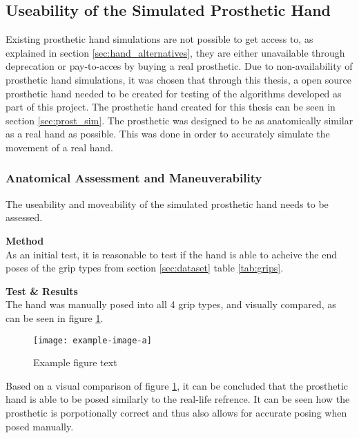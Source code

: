 \documentclass[../main.tex]{subfiles}
\begin{document}
\subsection{Useability of the Simulated Prosthetic Hand}

Existing prosthetic hand simulations are not possible to get access to, as explained in section \ref{sec:hand_alternatives}, they are either unavailable through deprecation or pay-to-acces by buying a real prosthetic.
Due to non-availability of prosthetic hand simulations, it was chosen that through this thesis, a open source prosthetic hand needed to be created for testing of the algorithms developed as part of this project.
The prosthetic hand created for this thesis can be seen in section \ref{sec:prost_sim}.
The prosthetic was designed to be as anatomically similar as a real hand as possible.
This was done in order to accurately simulate the movement of a real hand.

\subsubsection{Anatomical Assessment and Maneuverability}

The useability and moveability of the simulated prosthetic hand needs to be assessed.

\textbf{Method}\\
As an initial test, it is reasonable to test if the hand is able to acheive the end poses of the grip types from section \ref{sec:dataset} table \ref{tab:grips}. 

\textbf{Test \& Results}\\

The hand was manually posed into all 4 grip types, and visually compared, as can be seen in figure  \ref{fig:hand_pose_test}.

\begin{figure}[h]
\begin{center}
\texttt{[image: example-image-a]}
\caption{Example figure text}
\label{fig:hand_pose_test}
\end{center}
\end{figure}

Based on a visual comparison of figure \ref{fig:hand_pose_test}, it can be concluded that the prosthetic hand is able to be posed similarly to the real-life refrence.
It can be seen how the prosthetic is porpotionally correct and thus also allows for accurate posing when posed manually.
\end{document}
